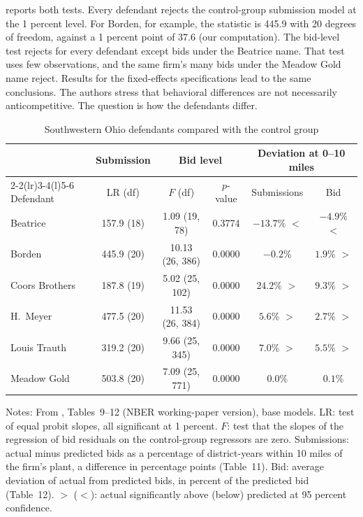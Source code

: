  reports both tests. Every defendant rejects the control-group submission model at the 1
percent level. For Borden, for example, the statistic is 445.9 with 20 degrees of freedom, against a 1 percent
point of 37.6 (our computation). The bid-level test rejects for every defendant except bids under the Beatrice
name. That test uses few observations, and the same firm's many bids under the Meadow Gold name reject. Results for
the fixed-effects specifications lead to the same conclusions. The authors stress that behavioral differences are
not necessarily anticompetitive. The question is how the defendants differ.

\begin{table}[htbp]
\centering
\caption{Southwestern Ohio defendants compared with the control group}\label{tab:13-pz99-tests}
\small
\begin{tabular}{@{}lccccc@{}}
\toprule
 & \multicolumn{1}{c}{Submission} & \multicolumn{2}{c}{Bid level} & \multicolumn{2}{c}{Deviation at 0--10 miles}\\
\cmidrule(lr){2-2}\cmidrule(lr){3-4}\cmidrule(l){5-6}
Defendant & LR (df) & $F$ (df) & $p$-value & Submissions & Bid\\
\midrule
Beatrice       & 157.9 (18) & 1.09 (19, 78)  & 0.3774 & $-13.7\%$ $<$ & $-4.9\%$ $<$\\
Borden         & 445.9 (20) & 10.13 (26, 386) & 0.0000 & $-0.2\%$ & $1.9\%$ $>$\\
Coors Brothers & 187.8 (19) & 5.02 (25, 102) & 0.0000 & $24.2\%$ $>$ & $9.3\%$ $>$\\
H.~Meyer       & 477.5 (20) & 11.53 (26, 384) & 0.0000 & $5.6\%$ $>$ & $2.7\%$ $>$\\
Louis Trauth   & 319.2 (20) & 9.66 (25, 345) & 0.0000 & $7.0\%$ $>$ & $5.5\%$ $>$\\
Meadow Gold    & 503.8 (20) & 7.09 (25, 771) & 0.0000 & $0.0\%$ & $0.1\%$\\
\bottomrule
\end{tabular}

\smallskip
\begin{minipage}{0.92\textwidth}\footnotesize
Notes: From \citet{PorterZona1999}, Tables~9--12 (NBER working-paper version), base models. LR: test
of equal probit slopes, all significant at 1 percent. $F$: test that the slopes of the regression of bid residuals
on the control-group regressors are zero. Submissions: actual minus predicted bids as a percentage of district-years
within 10 miles of the firm's plant, a difference in percentage points (Table~11). Bid: average deviation of actual from predicted bids, in percent of
the predicted bid (Table~12). $>$ ($<$): actual significantly above (below) predicted at 95 percent confidence.
\end{minipage}
\end{table}

